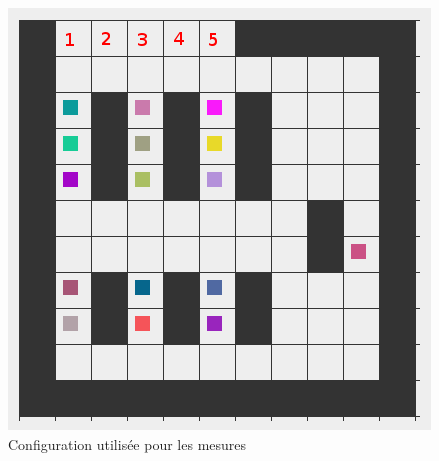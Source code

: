 	\begin{figure}[H]
	\centering
	\includegraphics[scale=0.4]{imagesPNG/grille2.png}
	\caption{Configuration utilisée pour les mesures\label{fig:configMesures}}
	\end{figure}